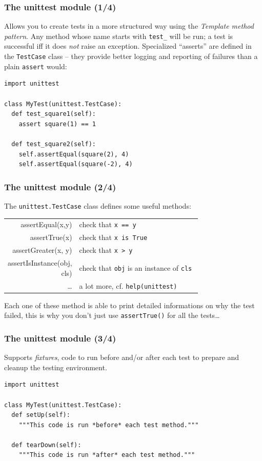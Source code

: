 \begin{frame}[fragile]\frametitle{The unittest module (1/4)}
  Allows you to create tests in a more structured way using the
  \textit{Template method pattern}. Any method whose name starts with \texttt{test\_} will be
  run; a test is successful iff it does \emph{not} raise an exception. Specialized ``asserts''
  are defined in the \texttt{TestCase} class -- they provide better logging and reporting of
  failures than a plain \texttt{assert} would:

  \begin{lstlisting}
import unittest

class MyTest(unittest.TestCase):
  def test_square1(self):
    assert square(1) == 1

  def test_square2(self):
    self.assertEqual(square(2), 4)
    self.assertEqual(square(-2), 4)
  \end{lstlisting}
\end{frame}

\begin{frame}[fragile]\frametitle{The unittest module (2/4)}

  The \texttt{unittest.TestCase} class defines some useful methods:
  
  
  \begin{tabular}{r | p{0.75\linewidth}}
  assertEqual(x,y)           & check that \texttt{x == y} \\
  assertTrue(x)              & check that \texttt{x is True} \\
  assertGreater(x, y)        & check that \texttt{x > y} \\
  assertIsInstance(obj, cls) & check that \texttt{obj} is an instance of \texttt{cls} \\
  \ldots                     & a lot more, cf. \texttt{help(unittest)}
  \end{tabular}

  Each one of these method is able to print detailed informations on
  why the test failed, this is why you don't just use
  \texttt{assertTrue()} for all the tests\ldots
\end{frame}

\begin{frame}[fragile]\frametitle{The unittest module (3/4)}
  Supports \textit{fixtures}, code to run before and/or after each
  test to prepare and cleanup the testing environment.

  \begin{lstlisting}
import unittest

class MyTest(unittest.TestCase):
  def setUp(self):
    """This code is run *before* each test method."""

  def tearDown(self):
    """This code is run *after* each test method."""
  \end{lstlisting}
\end{frame}

